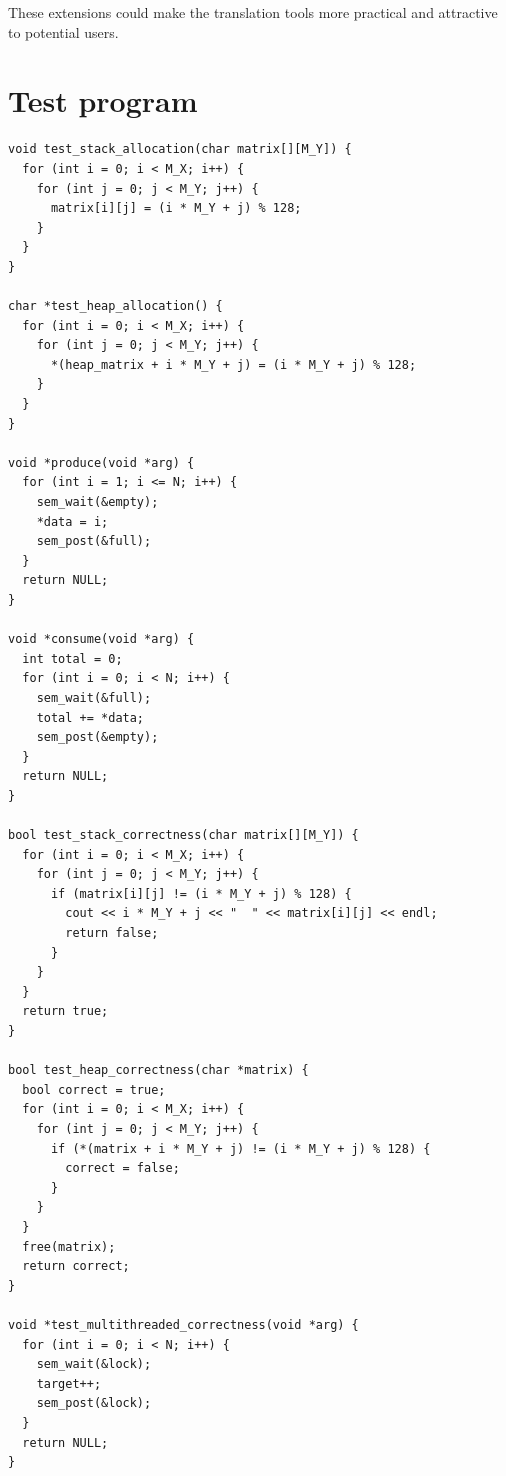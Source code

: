 \documentclass[bsc,frontabs,twoside,singlespacing,parskip,deptreport]{infthesis}     %
\begin{document}
These extensions could make the translation tools more practical and attractive to potential users.




\appendix
\chapter{Test program}
\label{section:test}

\begin{lstlisting}[style=block]
void test_stack_allocation(char matrix[][M_Y]) {
  for (int i = 0; i < M_X; i++) {
    for (int j = 0; j < M_Y; j++) {
      matrix[i][j] = (i * M_Y + j) % 128;
    }
  }
}

char *test_heap_allocation() {
  for (int i = 0; i < M_X; i++) {
    for (int j = 0; j < M_Y; j++) {
      *(heap_matrix + i * M_Y + j) = (i * M_Y + j) % 128;
    }
  }
}

void *produce(void *arg) {
  for (int i = 1; i <= N; i++) {
    sem_wait(&empty);
    *data = i;
    sem_post(&full);
  }
  return NULL;
}

void *consume(void *arg) {
  int total = 0;
  for (int i = 0; i < N; i++) {
    sem_wait(&full);
    total += *data;
    sem_post(&empty);
  }
  return NULL;
}

bool test_stack_correctness(char matrix[][M_Y]) {
  for (int i = 0; i < M_X; i++) {
    for (int j = 0; j < M_Y; j++) {
      if (matrix[i][j] != (i * M_Y + j) % 128) {
        cout << i * M_Y + j << "  " << matrix[i][j] << endl;
        return false;
      }
    }
  }
  return true;
}

bool test_heap_correctness(char *matrix) {
  bool correct = true;
  for (int i = 0; i < M_X; i++) {
    for (int j = 0; j < M_Y; j++) {
      if (*(matrix + i * M_Y + j) != (i * M_Y + j) % 128) {
        correct = false;
      }
    }
  }
  free(matrix);
  return correct;
}

void *test_multithreaded_correctness(void *arg) {
  for (int i = 0; i < N; i++) {
    sem_wait(&lock);
    target++;
    sem_post(&lock);
  }
  return NULL;
}
\end{lstlisting}
\end{document}
